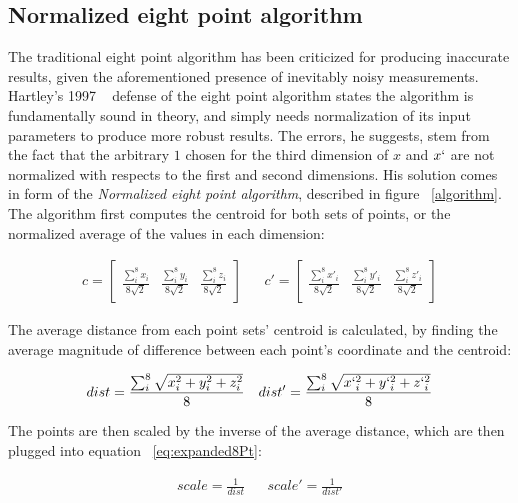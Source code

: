 \documentclass[Conference]{IEEEtran}
\begin{document}
\subsection{Normalized eight point algorithm}

The traditional eight point algorithm has been criticized for producing inaccurate results, given the aforementioned presence of inevitably noisy measurements.  Hartley’s 1997 ~\cite{Hartley:1997:DEA:262631.262634} defense of the eight point algorithm states the algorithm is fundamentally sound in theory, and simply needs normalization of its input parameters to produce more robust results. The errors, he suggests, stem from the fact that the arbitrary $1$ chosen for the third dimension of $x$ and $x`$ are not normalized with respects to the first and second dimensions.
His solution comes in form of the \textit{Normalized eight point algorithm}, described in figure ~\ref{algorithm}. The algorithm first computes the centroid for both sets of points, or the normalized average of the values in each dimension:

\begin{align}\label{eq:centroid}
    c =\begin{bmatrix}
        \frac{\sum_{i}^{8}x_i}{8\sqrt{2}} & \frac{\sum_{i}^{8}y_i}{8\sqrt{2}} & \frac{\sum_{i}^{8}z_i}{8\sqrt{2}}
    \end{bmatrix}
&&
    c' =\begin{bmatrix}
        \frac{\sum_{i}^{8}x'_i}{8\sqrt{2}} & \frac{\sum_{i}^{8}y'_i}{8\sqrt{2}} & \frac{\sum_{i}^{8}z'_i}{8\sqrt{2}}
    \end{bmatrix}
\end{align}

The average distance from each point sets' centroid is calculated, by finding the average magnitude of difference between each point's coordinate and the centroid:

\begin{align}\label{eq:avgDistance}
    dist = \frac{
        \sum_{i}^{8}
        \sqrt{x_i^{2}+y_i^{2}+z_i^{2}}
    }{8}
&&
    dist' = \frac{
        \sum_{i}^{8}
        \sqrt{x`_i^{2}+y`_i^{2}+z`_i^{2}}
    }{8}
\end{align}

The points are then scaled by the inverse of the average distance, which are then plugged into equation ~\eqref{eq:expanded8Pt}:

\begin{align}\label{eq:scale}
    scale = \frac{1}{dist}
&&
    scale' = \frac{1}{dist'}
\end{align}
\end{document}
